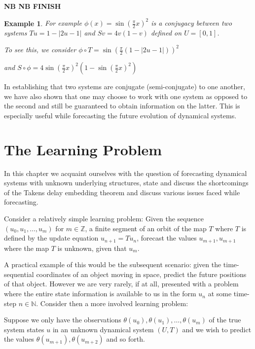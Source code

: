 \documentclass[a4paper,12pt,twoside]{report}
\newtheorem{Example}{Example}[]
\begin{document}
\textbf{NB NB FINISH}
\begin{Example}
  For example $\phi(x)=\sin(\frac{\pi}{2}x)^2$ is a conjugacy between two systems $Tu=1-|2u-1|$ and $Sv=4v(1-v)$  defined on $U=[0,1]$.  

  To see this, we consider $\phi\circ{T} = \sin(\frac{\pi}{2}(1-|2u-1|))^2$

  and $S\circ\phi = 4\sin(\frac{\pi}{2}x)^{2}(1-\sin(\frac{\pi}{2}x)^2)$
\end{Example}


In establishing that two systems are conjugate (semi-conjugate) to one another, we have also shown that one may choose to work with one system as opposed to the second and still be guaranteed to obtain information on the latter. This is especially useful while forecasting the future evolution of dynamical systems. 


\chapter{The Learning Problem}\label{ch3}

In this chapter we acquaint ourselves with the question of forecasting dynamical systems with unknown underlying structures, state and discuss the shortcomings of the Takens delay embedding theorem and discuss various issues faced while forecasting. 

Consider a relatively simple learning problem: 
Given the sequence $(u_0, u_1, \ldots, u_m)$ for $m\in\mathbb{Z}$, a finite segment of an orbit of the map $T$ where $T$ is defined by the update equation $u_{n+1} = Tu_n$, forecast the values $u_{m+1}, u_{m+1}$ where the map $T$ is unknown, given that $u_m$. 

A practical example of this would be the subsequent scenario: given the time-sequential coordinates of an object moving in space, predict the future positions of that object. However we are very rarely, if at all, presented with a problem where the entire state information is available to us in the form $u_n$ at some time-step $n\in\mathbb{N}$. Consider then a more involved learning problem:

Suppose we only have the observations $\theta(u_0), \theta(u_1), \ldots, \theta(u_m)$ of the true system states $u$ in an unknown dynamical system $(U,T)$ and we wish to predict the values $\theta(u_{m+1}), \theta(u_{m+2})$ and so forth.
\end{document}
